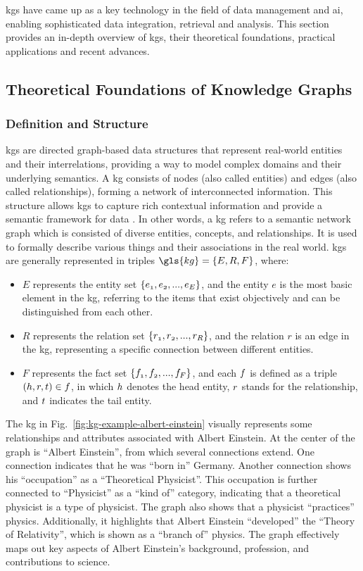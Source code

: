 \glspl{kg} have came up as a key technology in the field of data management and \gls{ai}, enabling sophisticated data integration, retrieval and analysis.
This section provides an in-depth overview of \glspl{kg}, their theoretical foundations, practical applications and recent advances.

\subsection*{Theoretical Foundations of Knowledge Graphs}
\subsubsection*{Definition and Structure}
\glspl{kg} are directed graph-based data structures that represent real-world entities and their interrelations, providing a way to model complex domains and their underlying semantics.
A \gls{kg} consists of nodes (also called entities) and edges (also called relationships), forming a network of interconnected information.
This structure allows \glspl{kg} to capture rich contextual information and provide a semantic framework for data \cite{Hogan2021}.
In other words, a \gls{kg} refers to a semantic network graph which is consisted of diverse entities, concepts, and relationships.
It is used to formally describe various things and their associations in the real world.
\glspl{kg} are generally represented in triples $\gls{kg}=\{\mathnormal{E,R,F}\}$, where:
\begin{itemize}
    \item $E$ represents the entity set $\{\mathnormal{e_1, e_2, ... ,e_E} \}$, and the entity $e$ is the most basic element in the \gls{kg}, referring to the items that exist objectively and can be distinguished from each other.
    \item $R$ represents the relation set $\{\mathnormal{r_1, r_2, ... ,r_R}\}$, and the relation $r$ is an edge in the \gls{kg}, representing a specific connection between different entities.
    \item $F$ represents the fact set $\{\mathnormal{f_1,f_2, ... ,f_F}\}$, and each $\mathnormal{f}$ is defined as a triple $(\mathnormal{h,r,t}) \in \mathnormal{f}$, in which $\mathnormal{h}$ denotes the head entity, $\mathnormal{r}$ stands for the relationship, and $\mathnormal{t}$ indicates the tail entity.
\end{itemize}

The \gls{kg} in Fig.~\ref{fig:kg-example-albert-einstein} visually represents some relationships and attributes associated with Albert Einstein.
At the center of the graph is ``Albert Einstein'', from which several connections extend.
One connection indicates that he was ``born in'' Germany.
Another connection shows his ``occupation'' as a ``Theoretical Physicist''.
This occupation is further connected to ``Physicist'' as a ``kind of'' category, indicating that a theoretical physicist is a type of physicist.
The graph also shows that a physicist ``practices'' physics.
Additionally, it highlights that Albert Einstein ``developed'' the ``Theory of Relativity'', which is shown as a ``branch of'' physics.
The graph effectively maps out key aspects of Albert Einstein's background, profession, and contributions to science.

